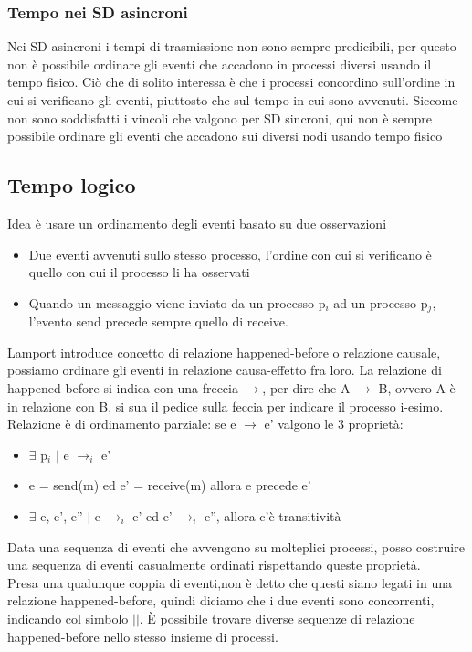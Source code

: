 \documentclass[16px]{article}
\begin{document}
\subsubsection{Tempo nei SD asincroni}
Nei SD asincroni i tempi di trasmissione non sono sempre predicibili, per questo non è possibile ordinare gli eventi che accadono in processi diversi usando il tempo fisico. Ciò che di solito interessa è che i processi concordino sull'ordine in cui si verificano gli eventi, piuttosto che sul tempo in cui sono avvenuti. Siccome non sono soddisfatti i vincoli che valgono per SD sincroni, qui non è sempre possibile ordinare gli eventi che accadono sui diversi nodi usando tempo fisico
\subsection{Tempo logico}
Idea è usare un ordinamento degli eventi basato su due osservazioni
\begin{itemize}
\item Due eventi avvenuti sullo stesso processo, l'ordine con cui si verificano è quello con cui il processo li ha osservati
\item Quando un messaggio viene inviato da un processo p$_i$ ad un processo p$_j$, l'evento send precede sempre quello di receive.
\end{itemize}
Lamport introduce concetto di relazione happened-before o relazione causale, possiamo ordinare gli eventi in relazione causa-effetto fra loro. La relazione di happened-before si indica con una freccia $\rightarrow$, per dire che  A $\rightarrow$ B, ovvero A è in relazione con B, si sua il pedice sulla feccia per indicare il processo i-esimo.\\ Relazione è di ordinamento parziale: se e $\rightarrow$ e' valgono le 3 proprietà:
\begin{itemize}
\item $\exists$ p$_i$ $|$ e $\rightarrow_i$ e'
\item e = send(m) ed e' = receive(m) allora e precede e'
\item $\exists$ e, e', e'' $|$ e $\rightarrow_i$ e' ed e' $\rightarrow_i$ e'', allora c'è transitività
\end{itemize}
Data una sequenza di eventi che avvengono su molteplici processi, posso costruire una sequenza di eventi casualmente ordinati rispettando queste proprietà.\\ Presa una qualunque coppia di eventi,non è detto che questi siano legati in una relazione happened-before, quindi diciamo che i due eventi sono concorrenti, indicando col simbolo $||$. È possibile trovare diverse sequenze di relazione happened-before nello stesso insieme di processi.
\end{document}
